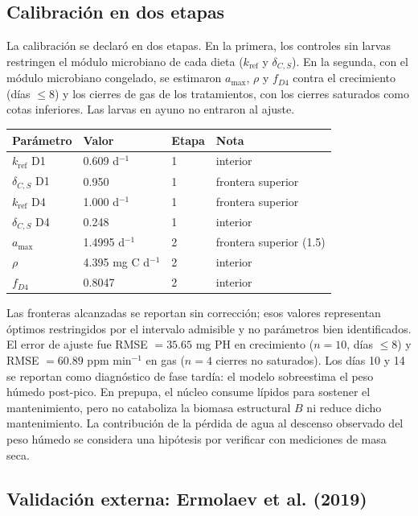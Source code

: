 \subsection{Calibración en dos etapas}

La calibración se declaró en dos etapas. En la primera, los controles sin larvas restringen el módulo microbiano de cada dieta ($k_{\mathrm{ref}}$ y $\delta_{C,S}$). En la segunda, con el módulo microbiano congelado, se estimaron $a_{\max}$, $\rho$ y $f_{D4}$ contra el crecimiento (días $\leq 8$) y los cierres de gas de los tratamientos, con los cierres saturados como cotas inferiores. Las larvas en ayuno no entraron al ajuste.

\begin{center}
\begin{tabular}{llll}
\toprule
Parámetro & Valor & Etapa & Nota \\
\midrule
$k_{\mathrm{ref}}$ D1 & 0.609 d$^{-1}$ & 1 & interior \\
$\delta_{C,S}$ D1 & 0.950 & 1 & frontera superior \\
$k_{\mathrm{ref}}$ D4 & 1.000 d$^{-1}$ & 1 & frontera superior \\
$\delta_{C,S}$ D4 & 0.248 & 1 & interior \\
$a_{\max}$ & 1.4995 d$^{-1}$ & 2 & frontera superior (1.5) \\
$\rho$ & 4.395 mg C d$^{-1}$ & 2 & interior \\
$f_{D4}$ & 0.8047 & 2 & interior \\
\bottomrule
\end{tabular}
\end{center}

Las fronteras alcanzadas se reportan sin corrección; esos valores representan óptimos restringidos por el intervalo admisible y no parámetros bien identificados. El error de ajuste fue RMSE $= 35.65$ mg PH en crecimiento ($n = 10$, días $\leq 8$) y RMSE $= 60.89$ ppm min$^{-1}$ en gas ($n = 4$ cierres no saturados). Los días 10 y 14 se reportan como diagnóstico de fase tardía: el modelo sobreestima el peso húmedo post-pico. En prepupa, el núcleo consume lípidos para sostener el mantenimiento, pero no cataboliza la biomasa estructural $B$ ni reduce dicho mantenimiento. La contribución de la pérdida de agua al descenso observado del peso húmedo se considera una hipótesis por verificar con mediciones de masa seca.



\subsection{Validación externa: Ermolaev et al. (2019)}

